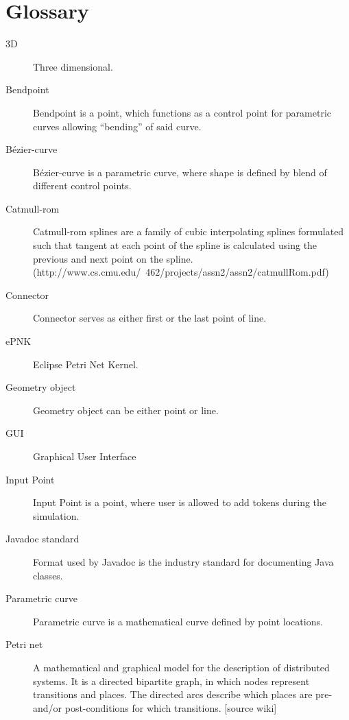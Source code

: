 \section{Glossary}
\begin{description}

\item [3D] Three dimensional.

\item [Bendpoint] Bendpoint is a point, which functions as a control point for parametric curves allowing “bending” of said curve.

\item [Bézier-curve] Bézier-curve is a parametric curve, where shape is defined by blend of different control points.

\item [Catmull-rom] Catmull-rom splines are a family of cubic interpolating splines formulated such that tangent at each point of the spline is calculated using the previous and next point on the spline. (http://www.cs.cmu.edu/~462/projects/assn2/assn2/catmullRom.pdf)

\item [Connector]  Connector serves as either first or the last point of line.

\item [ePNK] Eclipse Petri Net Kernel.

\item [Geometry object] Geometry object can be either point or line.

\item [GUI] Graphical User Interface

\item [Input Point] Input Point is a point, where user is allowed to add tokens during the simulation.

\item [Javadoc standard] Format used by Javadoc is the industry standard for documenting Java classes.

\item [Parametric curve] Parametric curve is a mathematical curve defined by point locations.

\item [Petri net] A mathematical and graphical model for the description of distributed systems. It is a directed bipartite graph, in which nodes represent transitions and places. The directed arcs describe which places are pre- and/or post-conditions for which transitions. [source wiki]


\end{description}
